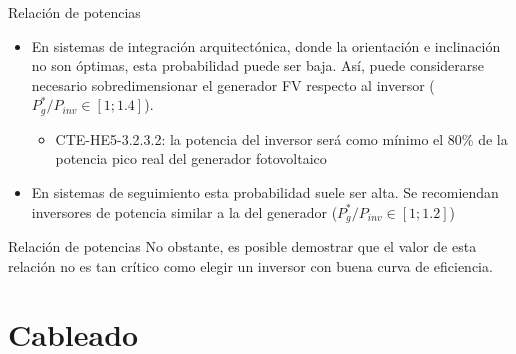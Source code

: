 \documentclass[xcolor={usenames,svgnames,dvipsnames}]{beamer}
\begin{document}
\begin{frame}[label=sec-2-0-4]{Relación de potencias}
\begin{itemize}
\item En \alert{sistemas de integración arquitectónica}, donde la orientación e inclinación no son óptimas, esta probabilidad puede ser baja. Así, puede considerarse necesario sobredimensionar el generador FV respecto al inversor ($P_{g}^{*}/P_{inv}\in\left[1;1.4\right]$).

\begin{itemize}
\item CTE-HE5-3.2.3.2: \guillemotleft{}la potencia del inversor será como mínimo el 80\% de la potencia pico real del generador fotovoltaico\guillemotright{}
\end{itemize}

\item En \alert{sistemas de seguimiento} esta probabilidad suele ser alta. Se recomiendan inversores de potencia similar a la del generador  ($P_{g}^{*}/P_{inv}\in\left[1;1.2\right]$)
\end{itemize}
\end{frame}

\begin{frame}[label=sec-2-0-5]{Relación de potencias}
No obstante, es posible demostrar que el valor de esta relación no es tan crítico como \alert{elegir un inversor con buena curva de eficiencia}.
\end{frame}

\section{Cableado}
\label{sec-3}
\end{document}
